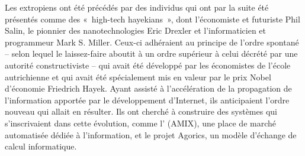 Les extropiens ont été précédés par des individus qui ont par la suite été présentés comme des «~high-tech hayekians~», dont l'économiste et futuriste Phil Salin, le pionnier des nanotechnologies Eric Drexler et l'informaticien et programmeur Mark S. Miller. Ceux-ci adhéraient au principe de l'ordre spontané -- selon lequel le laissez-faire aboutit à un ordre supérieur à celui décrété par une autorité constructiviste -- qui avait été développé par les économistes de l'école autrichienne et qui avait été spécialement mis en valeur par le prix Nobel d'économie Friedrich Hayek. Ayant assisté à l'accélération de la propagation de l'information apportée par le développement d'Internet, ils anticipaient l'ordre nouveau qui allait en résulter. Ils ont cherché à construire des systèmes qui s'inscrivaient dans cette évolution, comme l' (AMIX), une place de marché automatisée dédiée à l'information, et le projet Agorics, un modèle d'échange de calcul informatique.

